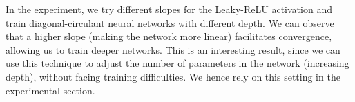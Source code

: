 In the experiment, we try different slopes for the Leaky-ReLU activation and train diagonal-circulant neural networks with different depth.
We can observe that a higher slope (making the network more linear) facilitates convergence, allowing us to train deeper networks.
This is an interesting result, since  we can use this technique to adjust the number of parameters in the network (increasing depth), without facing training difficulties.
We hence rely on this setting in the experimental section. 

\pagebreak

%
%
%
%
%


